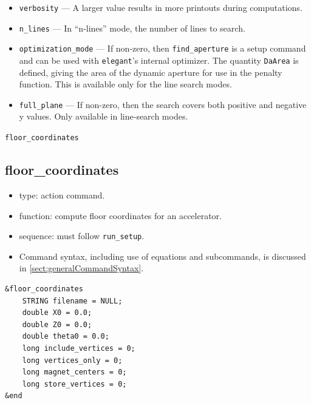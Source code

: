 \documentclass[11pt]{article}
\begin{document}
\begin{itemize}
\item \verb|verbosity| --- A larger value results in more printouts during computations.

\item \verb|n_lines| --- In ``n-lines'' mode, the number of lines to search.

\item \verb|optimization_mode| --- If non-zero, then \verb|find_aperture| is a setup command and can be used
with {\tt elegant}'s internal optimizer.  The quantity \verb|DaArea| is defined, giving the area of the dynamic
aperture for use in the penalty function.  This is available only for the line search modes.

\item \verb|full_plane| --- If non-zero, then the search covers both positive and negative y values.
  Only available in line-search modes.

\end{itemize}

\newpage
\begin{center}{\Large\verb|floor_coordinates|}\end{center}
\subsection{floor\_coordinates \label{subsec:floorcoordinates}}

\begin{itemize}
\item type: action command.
\item function: compute floor coordinates for an accelerator.
\item sequence: must follow \verb|run_setup|.
\item Command syntax, including use of equations and subcommands, is discussed in \ref{sect:generalCommandSyntax}.
\end{itemize}

\begin{verbatim}
&floor_coordinates
    STRING filename = NULL;
    double X0 = 0.0;
    double Z0 = 0.0;
    double theta0 = 0.0;
    long include_vertices = 0;
    long vertices_only = 0;
    long magnet_centers = 0;
    long store_vertices = 0;
&end
\end{verbatim}
\end{document}
